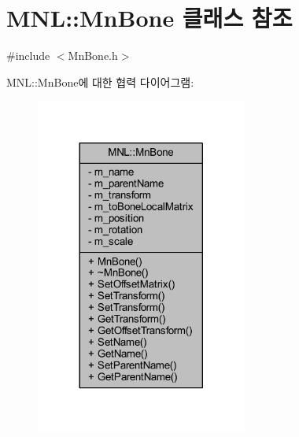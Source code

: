 \hypertarget{class_m_n_l_1_1_mn_bone}{}\section{M\+NL\+:\+:Mn\+Bone 클래스 참조}
\label{class_m_n_l_1_1_mn_bone}


{\ttfamily \#include $<$Mn\+Bone.\+h$>$}



M\+NL\+:\+:Mn\+Bone에 대한 협력 다이어그램\+:\nopagebreak
\begin{figure}[H]
\begin{center}
\leavevmode
\includegraphics[width=197pt]{class_m_n_l_1_1_mn_bone__coll__graph}
\end{center}
\end{figure}
